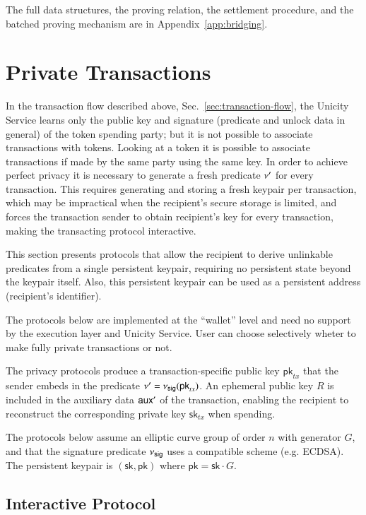 The full data structures, the proving relation, the settlement procedure, and the batched proving mechanism are in Appendix~\ref{app:bridging}.

\section{Private Transactions}\label{sec:private-transactions}

In the transaction flow described above, Sec.~\ref{sec:transaction-flow}, the Unicity Service learns only the public key and signature (predicate and unlock data in general) of the token spending party; but it is not possible to associate transactions with tokens. Looking at a token it is possible to associate transactions if made by the same party using the same key. In order to achieve perfect privacy it is necessary to generate a fresh predicate $\nu'$ for every transaction. This requires generating and storing a fresh keypair per transaction, which may be impractical when the recipient's secure storage is limited, and forces the transaction sender to obtain recipient's key for every transaction, making the transacting protocol interactive.

This section presents protocols that allow the recipient to derive unlinkable predicates from a single persistent keypair, requiring no persistent state beyond the keypair itself. Also, this persistent keypair can be used as a persistent address (recipient's identifier).

The protocols below are implemented at the ``wallet'' level and need no support by the execution layer and Unicity Service. User can choose selectively wheter to make fully private transactions or not.

The privacy protocols produce a transaction-specific public key $\mathsf{pk}_{tx}$ that the sender embeds in the predicate $\nu' = \nu_\mathsf{sig}(\mathsf{pk}_{tx})$. An ephemeral public key $R$ is included in the auxiliary data $\mathsf{aux}'$ of the transaction, enabling the recipient to reconstruct the corresponding private key $\mathsf{sk}_{tx}$ when spending.

The protocols below assume an elliptic curve group of order $n$ with generator $G$, and that the signature predicate $\nu_\mathsf{sig}$ uses a compatible scheme (e.g. ECDSA). The persistent keypair is $(\mathsf{sk}, \mathsf{pk})$ where $\mathsf{pk} = \mathsf{sk} \cdot G$.

\subsection{Interactive Protocol}\label{sec:private-interactive}

